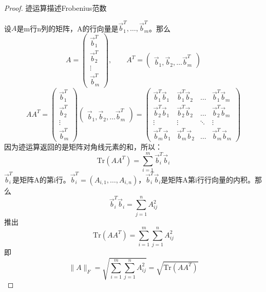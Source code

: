 \begin{proof}迹运算描述Frobenius范数
	
	设$A$是m行n列的矩阵，A的行向量是$\overrightarrow{b}_1^T,\dots,\overrightarrow{b}_m^T$。那么 
	\begin{equation}
		A=\begin{pmatrix}
			\overrightarrow{b}_1^T\\
			\overrightarrow{b}_2^T\\
			\vdots\\
			\overrightarrow{b}_m^T
		\end{pmatrix},\qquad 
		A^T=\begin{pmatrix}
			\overrightarrow{b}_1,
			\overrightarrow{b}_2,
			\dots
			\overrightarrow{b}_m^T
		\end{pmatrix}
	\end{equation}
	\begin{equation}
		AA^T=\begin{pmatrix}
			\overrightarrow{b}_1^T\\
			\overrightarrow{b}_2^T\\
			\vdots\\
			\overrightarrow{b}_m^T
		\end{pmatrix}\begin{pmatrix}
			\overrightarrow{b}_1,
			\overrightarrow{b}_2,
			\dots
			\overrightarrow{b}_m^T
		\end{pmatrix}=\begin{pmatrix}
			\overrightarrow{b}_1^T\overrightarrow{b}_1&\overrightarrow{b}_1^T\overrightarrow{b}_2&
			\dots&
			\overrightarrow{b}_1^T\overrightarrow{b}_m\\
			\overrightarrow{b}_2^T\overrightarrow{b}_1&\overrightarrow{b}_2^T\overrightarrow{b}_2&
			\dots&
			\overrightarrow{b}_2^T\overrightarrow{b}_m\\
			\vdots&\vdots&\ddots&\vdots\\
			\overrightarrow{b}_m^T\overrightarrow{b}_1&\overrightarrow{b}_m^T\overrightarrow{b}_2&
			\dots&
			\overrightarrow{b}_m^T\overrightarrow{b}_m			
		\end{pmatrix}
	\end{equation}
	因为迹运算返回的是矩阵对角线元素的和，所以：
	\begin{equation}
		\mathrm{Tr}(AA^T)=\sum_{i=1}^{m}\overrightarrow{b}_i^T\overrightarrow{b}_i
	\end{equation}
	$\overrightarrow{b}_i^T$是矩阵A的第i行。$\overrightarrow{b}_i^T=(A_{i,1},\dots,A_{i,n})$，$\overrightarrow{b}_i^T\overrightarrow{b}_i$是矩阵A第i行行向量的内积。那么
	\begin{equation}
		\overrightarrow{b}_i^T\overrightarrow{b}_i=\sum_{j=1}^{n}A_{ij}^2
	\end{equation}
	推出
	\begin{equation}
		\mathrm{Tr}(AA^T)=\sum_{i=1}^{m}\sum_{j=1}^{n}A_{ij}^2
	\end{equation}
	即
	\begin{equation}
		\lVert A \rVert_F=\sqrt{\sum_{i=1}^{m}\sum_{j=1}^{n}A_{ij}^2}=\sqrt{\mathrm{Tr}(AA^T)}
	\end{equation}
\end{proof}

